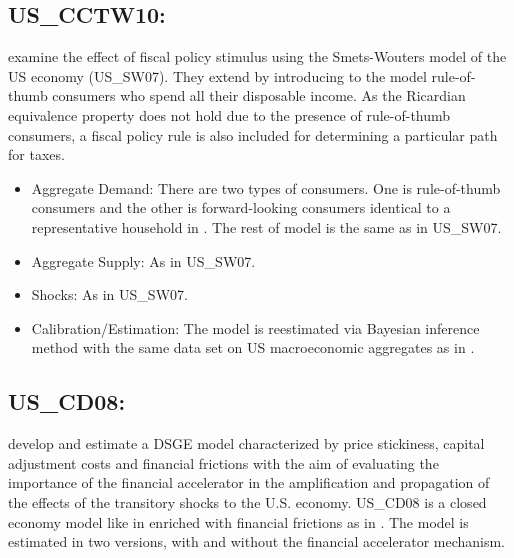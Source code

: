 \documentclass[11pt,a4paper]{article}
\begin{document}
	
	
	
	\subsection{US\_CCTW10: \cite{CoganCwikTaylorWieland2010}}
	\label{USCCTW10}
	
	\cite{CoganCwikTaylorWieland2010} examine the effect of fiscal policy stimulus using the Smets-Wouters model of the US economy (US\_SW07). They extend \cite{SmetsWouters2007} by introducing to the model rule-of-thumb consumers who spend all their disposable income. As the Ricardian equivalence property does not hold due to the presence of rule-of-thumb consumers, a fiscal policy rule is also included for determining a particular path for taxes.
	
	\begin{itemize}
		
		\item Aggregate Demand: There are two types of consumers. One is rule-of-thumb consumers and the other is forward-looking consumers identical to a representative household in \cite{SmetsWouters2007}. The rest of model is the same as in US\_SW07.
		
		\item Aggregate Supply: As in US\_SW07.
		
		\item Shocks: As in US\_SW07.
		
		\item Calibration/Estimation: The model is reestimated via Bayesian inference method with the same data set on US macroeconomic aggregates as in \cite{SmetsWouters2007}.
		
		
	\end{itemize}
	
	
	
	\subsection{US\_CD08: \cite{ChristensenDib2008}}
	\label{USCD08}
	\cite{ChristensenDib2008} develop and estimate a DSGE model characterized by price stickiness, capital adjustment costs and financial frictions with the aim of evaluating the importance of the financial accelerator in the amplification and propagation of the effects of the transitory shocks to the U.S. economy. {US\_CD08} is a closed economy model like in \cite{Ireland2003} enriched with financial frictions as in \cite{BernankeGertlerGilchrist1999}. The model is estimated in two versions, with and without the financial accelerator mechanism.
	
\end{document}
